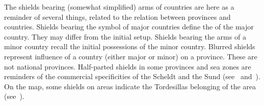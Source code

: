 \aparag[Shields] The shields bearing (somewhat simplified) arms of countries
are here as a reminder of several things, related to the relation between
provinces and countries.
 Shields bearing the symbol of major countries define
the  of the major country. They may differ from the
initial setup.
 Shields bearing the arms of a minor
country recall the initial possessions of the minor country.
\bparag[Influence] Blurred shields represent influence of a country (either
major or minor) on a province. These are not national provinces.
 Half-parted shields in some provinces and sea
zones are reminders of
the commercial specificities of the Scheldt and the Sund
(see~ and~).
 On the \ROTW map, some shields on areas
indicate the Tordesillas belonging of the area
(see~).

